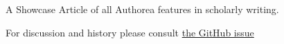 A Showcase Article of all Authorea features in scholarly writing.

For discussion and history please consult \href{https://github.com/natejenkins/socialApp/issues/1601}{the GitHub issue}